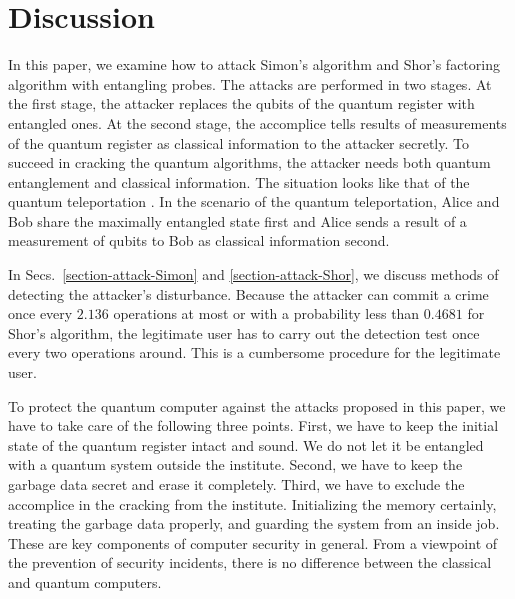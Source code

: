 \documentclass[12pt]{article}
\begin{document}
\section{\label{section-discussion}Discussion}
In this paper,
we examine how to attack Simon's algorithm and Shor's factoring algorithm
with entangling probes.
The attacks are performed in two stages.
At the first stage,
the attacker replaces the qubits of the quantum register with entangled ones.
At the second stage,
the accomplice tells results of measurements of the quantum register as classical information to the attacker secretly.
To succeed in cracking the quantum algorithms,
the attacker needs both quantum entanglement and classical information.
The situation looks like that of the quantum teleportation
\cite{Bennett1993}.
In the scenario of the quantum teleportation,
Alice and Bob share the maximally entangled state first and Alice sends a result of a measurement of qubits to Bob as classical information second.

In Secs.~\ref{section-attack-Simon} and \ref{section-attack-Shor},
we discuss methods of detecting the attacker's disturbance.
Because the attacker can commit a crime once every $2.136$ operations at most or with a probability less than $0.4681$
for Shor's algorithm,
the legitimate user has to carry out the detection test once every two operations around.
This is a cumbersome procedure for the legitimate user.

To protect the quantum computer against the attacks proposed in this paper,
we have to take care of the following three points.
First, we have to keep the initial state of the quantum register intact and sound.
We do not let it be entangled with a quantum system outside the institute.
Second, we have to keep the garbage data secret and erase it completely.
Third, we have to exclude the accomplice in the cracking from the institute.
Initializing the memory certainly,
treating the garbage data properly,
and guarding the system from an inside job.
These are key components of computer security in general.
From a viewpoint of the prevention of security incidents,
there is no difference between the classical and quantum computers.
\end{document}
